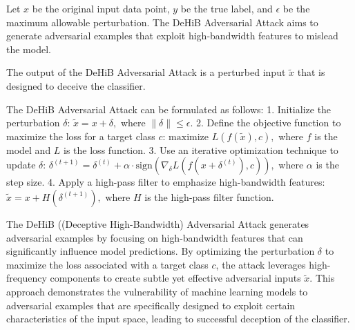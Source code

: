 Let \( x \) be the original input data point, \( y \) be the true label, and \( \epsilon \) be the maximum allowable perturbation. The DeHiB Adversarial Attack aims to generate adversarial examples that exploit high-bandwidth features to mislead the model.

The output of the DeHiB Adversarial Attack is a perturbed input \( \tilde{x} \) that is designed to deceive the classifier.

The DeHiB Adversarial Attack can be formulated as follows:
1. Initialize the perturbation \( \delta \):
   $
   \tilde{x} = x + \delta,
   $
   where \( \|\delta\| \leq \epsilon \).
2. Define the objective function to maximize the loss for a target class \( c \):
   $
   \text{maximize } L(f(\tilde{x}), c),
   $
   where \( f \) is the model and \( L \) is the loss function.
3. Use an iterative optimization technique to update \( \delta \):
   $
   \delta^{(t+1)} = \delta^{(t)} + \alpha \cdot \text{sign}(\nabla_{\delta} L(f(x + \delta^{(t)}), c)),
   $
   where \( \alpha \) is the step size.
4. Apply a high-pass filter to emphasize high-bandwidth features:
   $
   \tilde{x} = x + H(\delta^{(t+1)}),
   $
   where \( H \) is the high-pass filter function.

The DeHiB ((Deceptive High-Bandwidth) Adversarial Attack generates adversarial examples by focusing on high-bandwidth features that can significantly influence model predictions. By optimizing the perturbation \( \delta \) to maximize the loss associated with a target class \( c \), the attack leverages high-frequency components to create subtle yet effective adversarial inputs \( \tilde{x} \). This approach demonstrates the vulnerability of machine learning models to adversarial examples that are specifically designed to exploit certain characteristics of the input space, leading to successful deception of the classifier.

